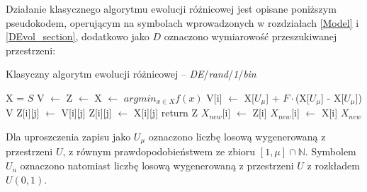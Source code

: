 \documentclass[12pt,a4paper]{report}
\begin{document}
{{\par{
Działanie klasycznego algorytmu ewolucji różnicowej jest opisane poniższym pseudokodem, operującym na symbolach wprowadzonych w rozdziałach \ref{Model} i \ref{DEvol_section}, dodatkowo jako $D$ oznaczono wymiarowość przeszukiwanej przestrzeni:
\begin{algorithm}[H]
\caption{Klasyczny algorytm ewolucji różnicowej -- \emph{DE}/\emph{rand}/\emph{1}/\emph{bin}}
\label{algorithm:de}
\begin{algorithmic}[1]
    \State X = $S$
	    \State V $\gets$ 
        \State Z $\gets$ 
        \State X $\gets$ 
    \EndWhile
    \State \Return $argmin_{x \in X} f(x)$
\EndFunction
\State
{}
    	\State V[i] $\gets$ X[$U_\mu$] + $F \cdot $(X[$U_\mu$] - X[$U_\mu$])
    \EndFor
    \State \Return V
\EndFunction
\State
{}
                \State Z[i][j] $\gets$ V[i][j]
            \Else
                \State Z[i][j] $\gets$ X[i][j]
            \EndIf
        \EndFor
    \EndFor
    \State \Return return Z
\EndFunction
\State
{}
            \State $X_{new}$[i] $\gets$ Z[i]
        \Else
            \State $X_{new}$[i] $\gets$ X[i]
        \EndIf
    \EndFor
    \State \Return $X_{new}$
\EndFunction
\end{algorithmic}
\end{algorithm}

Dla uproszczenia zapisu jako $U_\mu$ oznaczono liczbę losową wygenerowaną z przestrzeni $U$, z równym prawdopodobieństwem ze zbioru $[1, \mu] \cap \mathbb{N}$. Symbolem $U_u$ oznaczono natomiast liczbę losową wygenerowaną z przestrzeni $U$ z rozkładem $U(0,1)$.
}

}}
\end{document}
